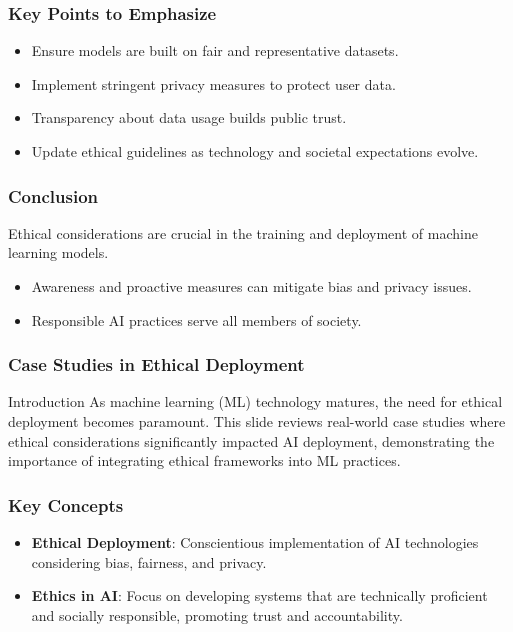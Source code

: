 \documentclass[aspectratio=169]{beamer}
\begin{document}
\begin{frame}[fragile]
    \frametitle{Key Points to Emphasize}
    \begin{itemize}
        \item Ensure models are built on fair and representative datasets.
        \item Implement stringent privacy measures to protect user data.
        \item Transparency about data usage builds public trust.
        \item Update ethical guidelines as technology and societal expectations evolve.
    \end{itemize}
\end{frame}

\begin{frame}[fragile]
    \frametitle{Conclusion}
    Ethical considerations are crucial in the training and deployment of machine learning models. 
    \begin{itemize}
        \item Awareness and proactive measures can mitigate bias and privacy issues.
        \item Responsible AI practices serve all members of society.
    \end{itemize}
\end{frame}

\begin{frame}[fragile]
    \frametitle{Case Studies in Ethical Deployment}
    \begin{block}{Introduction}
        As machine learning (ML) technology matures, the need for ethical deployment becomes paramount. 
        This slide reviews real-world case studies where ethical considerations significantly impacted AI deployment, 
        demonstrating the importance of integrating ethical frameworks into ML practices.
    \end{block}
\end{frame}

\begin{frame}[fragile]
    \frametitle{Key Concepts}
    \begin{itemize}
        \item \textbf{Ethical Deployment}: Conscientious implementation of AI technologies considering bias, fairness, and privacy.
        \item \textbf{Ethics in AI}: Focus on developing systems that are technically proficient and socially responsible, promoting trust and accountability.
    \end{itemize}
\end{frame}
\end{document}

